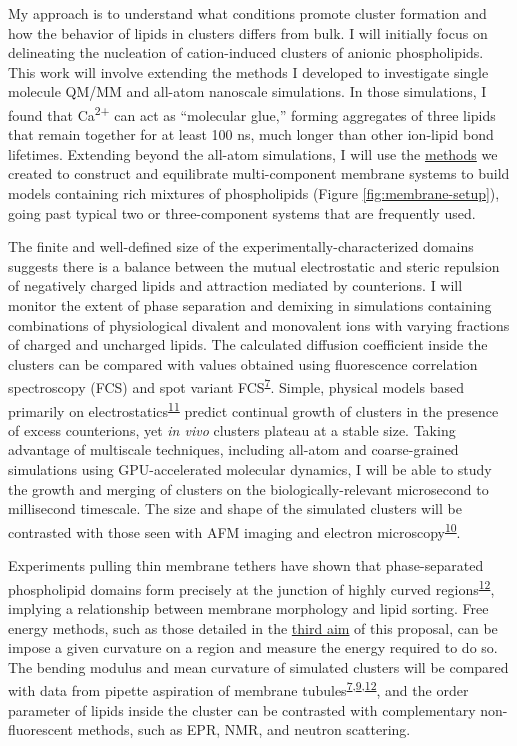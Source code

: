 \documentclass[11pt,notitlepage]{article}
\begin{document}
My approach is to understand what conditions promote cluster formation
and how the behavior of lipids in clusters differs from bulk. I will
initially focus on delineating the nucleation of cation-induced clusters
of anionic phospholipids. This work will involve extending the methods I
developed to investigate single molecule QM/MM and all-atom nanoscale
simulations. In those simulations, I found that Ca\textsuperscript{2+}
can act as ``molecular glue,'' forming aggregates of three lipids that
remain together for at least 100 ns, much longer than other ion-lipid
bond lifetimes. Extending beyond the all-atom simulations, I will use
the \href{https://github.com/biophyscode}{methods} we created to
construct and equilibrate multi-component membrane systems to build
models containing rich mixtures of phospholipids (Figure
\ref{fig:membrane-setup}), going past typical two or three-component
systems that are frequently used.

The finite and well-defined size of the experimentally-characterized
domains suggests there is a balance between the mutual electrostatic and
steric repulsion of negatively charged lipids and attraction mediated by
counterions. I will monitor the extent of phase separation and demixing
in simulations containing combinations of physiological divalent and
monovalent ions with varying fractions of charged and uncharged lipids.
The calculated diffusion coefficient inside the clusters can be compared
with values obtained using fluorescence correlation spectroscopy (FCS)
and spot variant
FCS\textsuperscript{\protect\hyperlink{ref-oBaB5Z87}{7}}. Simple,
physical models based primarily on
electrostatics\textsuperscript{\protect\hyperlink{ref-10CqL9t0a}{11}}
predict continual growth of clusters in the presence of excess
counterions, yet \emph{in vivo} clusters plateau at a stable size.
Taking advantage of multiscale techniques, including all-atom and
coarse-grained simulations using GPU-accelerated molecular dynamics, I
will be able to study the growth and merging of clusters on the
biologically-relevant microsecond to millisecond timescale. The size and
shape of the simulated clusters will be contrasted with those seen with
AFM imaging and electron
microscopy\textsuperscript{\protect\hyperlink{ref-LhOwGz4k}{10}}.

Experiments pulling thin membrane tethers have shown that
phase-separated phospholipid domains form precisely at the junction of
highly curved
regions\textsuperscript{\protect\hyperlink{ref-XIltXoGI}{12}}, implying
a relationship between membrane morphology and lipid sorting. Free
energy methods, such as those detailed in the
\protect\hyperlink{build-advanced-technologies-to-perform-free-energy-calculations-for-drug-design}{third
aim} of this proposal, can be impose a given curvature on a region and
measure the energy required to do so. The bending modulus and mean
curvature of simulated clusters will be compared with data from pipette
aspiration of membrane
tubules\textsuperscript{\protect\hyperlink{ref-oBaB5Z87}{7},\protect\hyperlink{ref-aiu6Tmil}{9},\protect\hyperlink{ref-XIltXoGI}{12}},
and the order parameter of lipids inside the cluster can be contrasted
with complementary non-fluorescent methods, such as EPR, NMR, and
neutron scattering.
\end{document}

